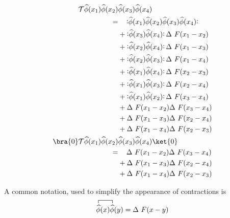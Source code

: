 \providecommand{\dww}[4]{\normbracket{\Op{\phi}(x_{#1}) \Op{\phi}(x_{#2})} \,  \Delta~F (x_{#3} - x_{#4}) }
\begin{example}
\begin{align*} \allowdisplaybreaks
 \tOrd \Op{\phi}(x_1) \Op{\phi}(x_2) &\Op{\phi}(x_3) \Op{\phi}(x_4) \\ =& \quad\, \normbracket{\Op{\phi}(x_1) \Op{\phi}(x_2) \Op{\phi}(x_3) \Op{\phi}(x_4)} \\
&+ \dww{3}{4}{1}{2} \\&+ \dww{2}{4}{1}{3} \\ &+ \dww{2}{3}{1}{4} \\&+ \dww{1}{4}{2}{3} \\ &+ \dww{1}{3}{2}{4} \\&+ \dww{1}{2}{3}{4} \\
&+ \Delta~F (x_1 - x_2) \Delta~F (x_3 - x_4) \\ &+ \Delta~F (x_1 - x_3) \Delta~F(x_2-x_4) \\ &+ \Delta~F(x_1-x_4) \Delta~F (x_2-x_3) \\
\bra{0}  \tOrd \Op{\phi}(x_1) \Op{\phi}(x_2) &\Op{\phi}(x_3) \Op{\phi}(x_4) \ket{0} \\
=&\quad\, \Delta~F (x_1 - x_2) \Delta~F (x_3 - x_4) \\ &+ \Delta~F (x_1 - x_3) \Delta~F(x_2-x_4) \\ &+ \Delta~F(x_1-x_4) \Delta~F (x_2-x_3) \\
\end{align*}
\end{example}
A common notation, used to simplify the appearance of contractions is
\begin{equation}
  \label{eq:73}
  \contraction{}{\Op{\phi}}{(x)}{\Op{\phi}}{}
  \Op{\phi}(x) \Op{\phi}(y) = \Delta~F (x-y)
\end{equation}

